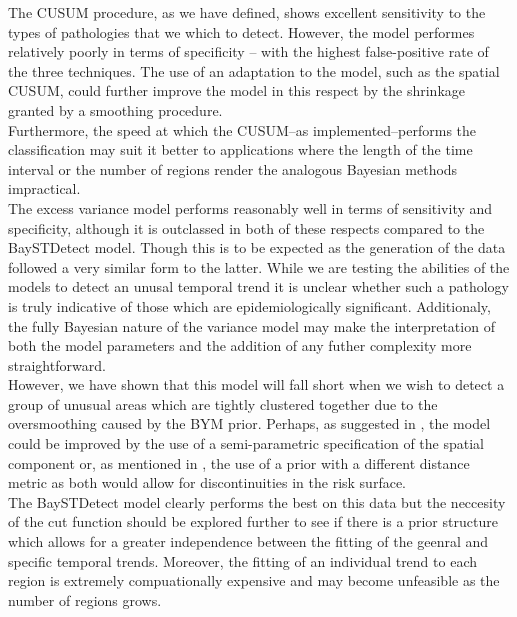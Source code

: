 \documentclass[11pt]{report}
\begin{document}
The CUSUM procedure, as we have defined, shows excellent sensitivity to the types of pathologies that we which to detect. However, the model performes relatively poorly in terms of specificity -- with the highest false-positive rate of the three techniques. The use of an adaptation to the model, such as the spatial CUSUM, could further improve the model in this respect by the shrinkage granted by a smoothing procedure. \\

Furthermore, the speed at which the CUSUM--as implemented--performs the classification may suit it better to applications where the length of the time interval or the number of regions render the analogous Bayesian methods impractical. \\

The excess variance model performs reasonably well in terms of sensitivity and specificity, although it is outclassed in both of these respects compared to the BaySTDetect model. Though this is to be expected as the generation of the data followed a very similar form to the latter. While we are testing the abilities of the models to detect an unusal temporal trend it is unclear whether such a pathology is truly indicative of those which are epidemiologically significant. Additionaly, the fully Bayesian nature of the variance model may make the interpretation of both the model parameters and the addition of any futher complexity more straightforward. \\

However, we have shown that this model will fall short when we wish to detect a group of unusual areas which are tightly clustered together due to the oversmoothing caused by the BYM prior. Perhaps, as suggested in \cite{best2005comparison}, the model could be improved by the use of a semi-parametric specification of the spatial component or, as mentioned in \cite{bym}, the use of a prior with a different distance metric as both would allow for discontinuities in the risk surface. \\

The BaySTDetect model clearly performs the best on this data but the neccesity of the cut function should be explored further to see if there is a prior structure which allows for a greater independence between the fitting of the geenral and specific temporal trends. Moreover, the fitting of an individual trend to each region is extremely compuationally expensive and may become unfeasible as the number of regions grows. \\
\end{document}
